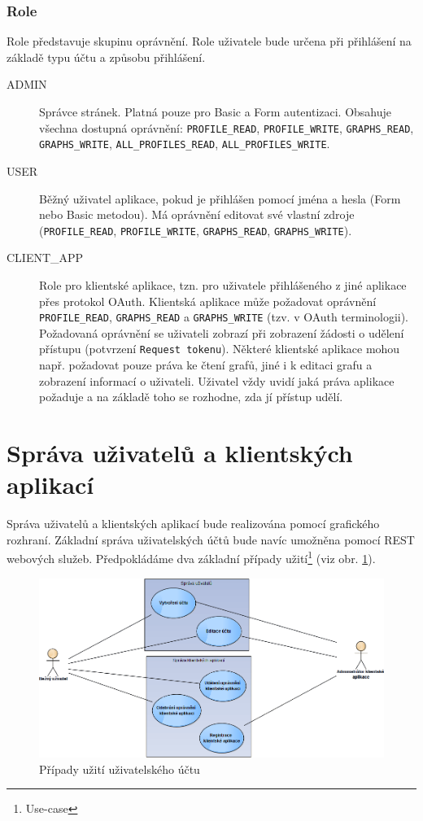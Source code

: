 \documentclass[thesis=M,czech]{FITthesis}[2014/05/6]
\begin{document}
\subsubsection{Role}
Role představuje skupinu oprávnění. Role uživatele bude určena při přihlášení na základě typu účtu a způsobu přihlášení.
\begin{description}
  \item[ADMIN] Správce stránek. Platná pouze pro Basic a Form autentizaci. Obsahuje všechna dostupná oprávnění: \texttt{PROFILE\_READ}, \texttt{PROFILE\_WRITE}, 
  \newline \texttt{GRAPHS\_READ}, \texttt{GRAPHS\_WRITE}, \texttt{ALL\_PROFILES\_READ}, \texttt{ALL\_PROFILES\_WRITE}.
  \item[USER] Běžný uživatel aplikace, pokud je přihlášen pomocí jména a hesla (Form nebo Basic metodou). Má oprávnění editovat své vlastní zdroje (\texttt{PROFILE\_READ}, \texttt{PROFILE\_WRITE}, \texttt{GRAPHS\_READ}, \texttt{GRAPHS\_WRITE}).
  \item[CLIENT\_APP] Role pro klientské aplikace, tzn. pro uživatele přihlášeného z jiné aplikace přes protokol OAuth. Klientská aplikace může požadovat oprávnění \texttt{PROFILE\_READ}, \texttt{GRAPHS\_READ} a \texttt{GRAPHS\_WRITE} (tzv.  v OAuth terminologii). Požadovaná oprávnění se uživateli zobrazí při zobrazení žádosti o udělení přístupu (potvrzení \texttt{Request tokenu}). Některé klientské aplikace mohou např. požadovat pouze práva ke čtení grafů, jiné i k editaci grafu a zobrazení informací o uživateli. Uživatel vždy uvidí jaká práva aplikace požaduje a na základě toho se rozhodne, zda jí přístup udělí.
\end{description}

\section{Správa uživatelů a klientských aplikací}
Správa uživatelů a klientských aplikací bude realizována pomocí grafického rozhraní. Základní správa uživatelských účtů bude navíc umožněna pomocí REST webových služeb.
Předpokládáme dva základní případy užití\footnote{Use-case} (viz obr. \ref{fig:sprava_uzivatelu-use_cases}).

\begin{figure}\centering
 	\includegraphics[width=1\textwidth]{images/diagram/sprava_uzivatelu-use_cases}
 	\caption[Případy užití uživatelského účtu]{Případy užití uživatelského účtu}\label{fig:sprava_uzivatelu-use_cases}
\end{figure}
\end{document}
